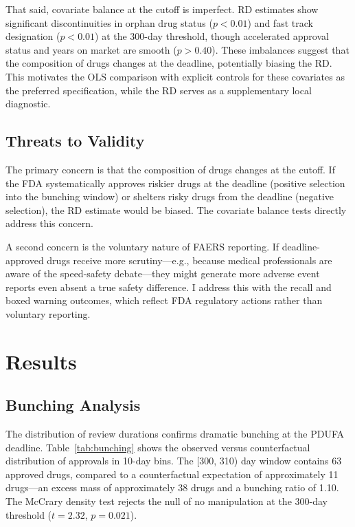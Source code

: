 \documentclass[12pt]{article}
\begin{document}
That said, covariate balance at the cutoff is imperfect. RD estimates show significant discontinuities in orphan drug status ($p < 0.01$) and fast track designation ($p < 0.01$) at the 300-day threshold, though accelerated approval status and years on market are smooth ($p > 0.40$). These imbalances suggest that the composition of drugs changes at the deadline, potentially biasing the RD. This motivates the OLS comparison with explicit controls for these covariates as the preferred specification, while the RD serves as a supplementary local diagnostic.

\subsection{Threats to Validity}

The primary concern is that the composition of drugs changes at the cutoff. If the FDA systematically approves riskier drugs at the deadline (positive selection into the bunching window) or shelters risky drugs from the deadline (negative selection), the RD estimate would be biased. The covariate balance tests directly address this concern.

A second concern is the voluntary nature of FAERS reporting. If deadline-approved drugs receive more scrutiny---e.g., because medical professionals are aware of the speed-safety debate---they might generate more adverse event reports even absent a true safety difference. I address this with the recall and boxed warning outcomes, which reflect FDA regulatory actions rather than voluntary reporting.

\section{Results}

\subsection{Bunching Analysis}

The distribution of review durations confirms dramatic bunching at the PDUFA deadline. Table~\ref{tab:bunching} shows the observed versus counterfactual distribution of approvals in 10-day bins. The [300, 310) day window contains 63 approved drugs, compared to a counterfactual expectation of approximately 11 drugs---an excess mass of approximately 38 drugs and a bunching ratio of 1.10. The McCrary density test rejects the null of no manipulation at the 300-day threshold ($t = 2.32$, $p = 0.021$).
\end{document}
